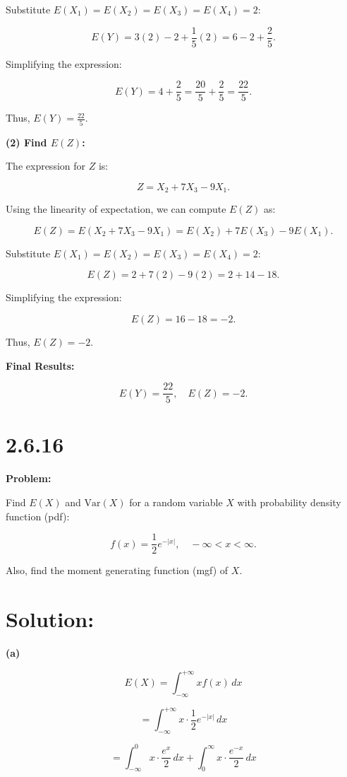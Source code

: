 \documentclass{article}
\begin{document}
Substitute \( E(X_1) = E(X_2) = E(X_3) = E(X_4) = 2 \):

\[
E(Y) = 3(2) - 2 + \frac{1}{5}(2) = 6 - 2 + \frac{2}{5}.
\]

Simplifying the expression:

\[
E(Y) = 4 + \frac{2}{5} = \frac{20}{5} + \frac{2}{5} = \frac{22}{5}.
\]

Thus, \( E(Y) = \frac{22}{5} \).

\textbf{(2) Find \( E(Z) \):}

The expression for \( Z \) is:

\[
Z = X_2 + 7X_3 - 9X_1.
\]

Using the linearity of expectation, we can compute \( E(Z) \) as:

\[
E(Z) = E(X_2 + 7X_3 - 9X_1) = E(X_2) + 7E(X_3) - 9E(X_1).
\]

Substitute \( E(X_1) = E(X_2) = E(X_3) = E(X_4) = 2 \):

\[
E(Z) = 2 + 7(2) - 9(2) = 2 + 14 - 18.
\]

Simplifying the expression:

\[
E(Z) = 16 - 18 = -2.
\]

Thus, \( E(Z) = -2 \).

\textbf{Final Results:}

\[
E(Y) = \frac{22}{5}, \quad E(Z) = -2.
\]


\section*{2.6.16}

\textbf{Problem:}

Find \( E(X) \) and \( \text{Var}(X) \) for a random variable \( X \) with probability density function (pdf):

\[
f(x) = \frac{1}{2} e^{-|x|}, \quad -\infty < x < \infty.
\]

Also, find the moment generating function (mgf) of \( X \).


\section*{Solution:}
\textbf{(a)}

\[
E(X) = \int_{-\infty}^{+\infty} x f(x) \, dx
\]

\[
= \int_{-\infty}^{+\infty} x \cdot \frac{1}{2} e^{-|x|} \, dx
\]

\[
= \int_{-\infty}^{0} x \cdot \frac{e^{x}}{2} \, dx + \int_{0}^{\infty} x \cdot \frac{e^{-x}}{2} \, dx
\]
\end{document}
